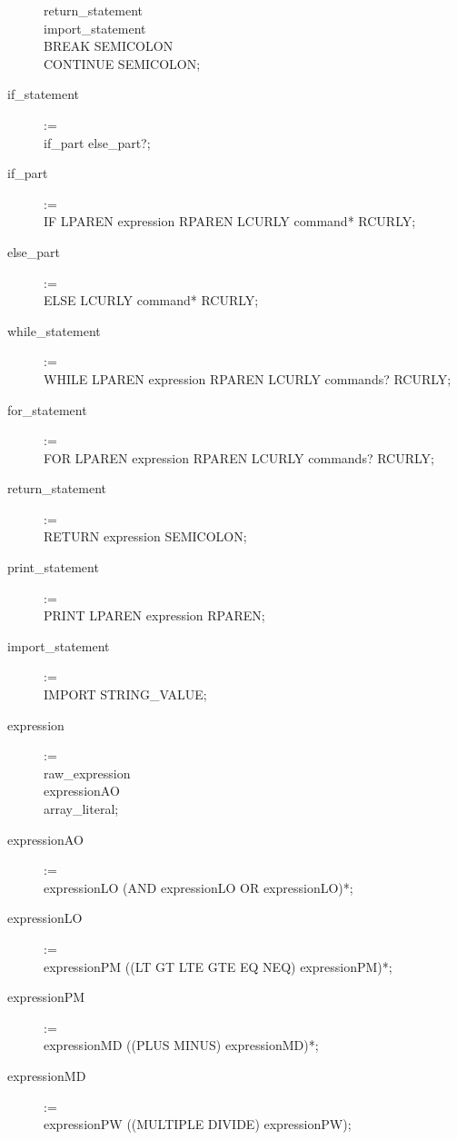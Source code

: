 \begin{description}
        return\_statement \textbar \\
        import\_statement \textbar \\
        BREAK SEMICOLON \textbar \\
        CONTINUE SEMICOLON;
    \item[if\_statement] := \hfill \\
        if\_part else\_part?;
    \item[if\_part] := \hfill \\
        IF LPAREN expression RPAREN LCURLY command* RCURLY;
    \item[else\_part] := \hfill \\
        ELSE LCURLY command* RCURLY;
    \item[while\_statement] := \hfill \\
        WHILE LPAREN expression RPAREN LCURLY commands? RCURLY;
    \item[for\_statement] := \hfill \\
        FOR LPAREN expression RPAREN LCURLY commands? RCURLY;
    \item[return\_statement] := \hfill \\
        RETURN expression SEMICOLON;
    \item[print\_statement] := \hfill \\
        PRINT LPAREN expression RPAREN; 
    \item[import\_statement] := \hfill \\
        IMPORT STRING\_VALUE; 
    \item[expression] := \hfill \\
        raw\_expression \textbar \\
        expressionAO \textbar \\
        array\_literal;
    \item[expressionAO] := \hfill \\
        expressionLO (AND expressionLO \textbar OR expressionLO)*;
    \item[expressionLO] := \hfill \\
        expressionPM ((LT \textbar GT \textbar LTE \textbar GTE \textbar EQ \textbar NEQ) expressionPM)*;
    \item[expressionPM] := \hfill \\
        expressionMD ((PLUS \textbar MINUS) expressionMD)*;
    \item[expressionMD] := \hfill \\
        expressionPW ((MULTIPLE \textbar DIVIDE) expressionPW);

\end{description}
